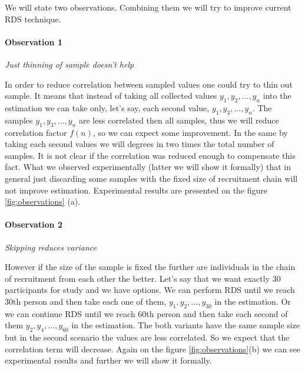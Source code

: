 \documentclass[12pt]{report}
\begin{document}
We will state two observations. Combining them we will try to improve current RDS technique.


\paragraph{Observation 1} \textit{Just thinning of sample doesn't help}

In order to reduce correlation between sampled values one could try to thin out sample. It means that instead of taking all collected values $y_1, y_2, ..., y_n$ into the estimation we can take only, let's say, each second value, $y_1, y_3, ..., y_n$. The samples $y_1, y_3, ..., y_n$ are less correlated then all samples, thus we will reduce correlation factor $f(n)$, so we can expect some improvement. In the same by taking each second values we will degrees in two times the total number of samples. It is not clear if the correlation was reduced enough to compensate this fact. What we observed experimentally (latter we will show it formally) that in general just discarding some samples with the fixed size of recruitment chain will not improve estimation. Experimental results are presented on the figure \ref{fig:observations} (a).

\paragraph{Observation 2} \textit{Skipping reduces variance}

However if the size of the sample is fixed the further are individuals in the chain of recruitment from each other the better. Let's say that we want exactly 30 participants for study and we have options. We can perform RDS until we reach 30th person and then take each one of them, $y_1, y_2, ..., y_{30}$ in the estimation. Or we can continue RDS until we reach 60th person and then take each second of them $y_2, y_4, ..., y_{60}$ in the estimation. The both variants have the same sample size but in the second scenario the values are less correlated. So we expect that the correlation term will decrease. Again on the figure \ref{fig:observations}(b) we can see experimental results and further we will show it formally.
\end{document}
